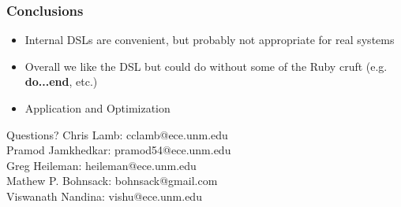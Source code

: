\documentclass[t, xcolor=dvipsnames, handout, 10pt]{beamer}
\begin{document}
\begin{frame}[t]
\frametitle{Conclusions}
\pause
\begin{itemize}
\item Internal DSLs are convenient, but probably not appropriate for real systems
\pause
\item Overall we like the DSL but could do without some of the Ruby cruft (e.g. \textbf{do...end}, etc.)
\pause
\item Application and Optimization
\end{itemize}
\pause
Questions?
\newline
\newline
Chris Lamb: cclamb@ece.unm.edu \\
Pramod Jamkhedkar: pramod54@ece.unm.edu \\
Greg Heileman: heileman@ece.unm.edu \\
Mathew P. Bohnsack: bohnsack@gmail.com \\
Viswanath Nandina: vishu@ece.unm.edu
\end{frame}
\end{document}
